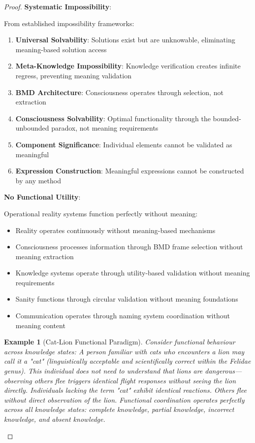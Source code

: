 \documentclass[12pt,a4paper]{article}
\newtheorem{example}{Example}
\begin{document}
\begin{proof}
\textbf{Systematic Impossibility}:

From established impossibility frameworks:
\begin{enumerate}
\item \textbf{Universal Solvability}: Solutions exist but are unknowable, eliminating meaning-based solution access
\item \textbf{Meta-Knowledge Impossibility}: Knowledge verification creates infinite regress, preventing meaning validation
\item \textbf{BMD Architecture}: Consciousness operates through selection, not extraction 
\item \textbf{Consciousness Solvability}: Optimal functionality through the bounded-unbounded paradox, not meaning requirements  
\item \textbf{Component Significance}: Individual elements cannot be validated as meaningful
\item \textbf{Expression Construction}: Meaningful expressions cannot be constructed by any method
\end{enumerate}

\textbf{No Functional Utility}:

Operational reality systems function perfectly without meaning:
\begin{itemize}
\item Reality operates continuously without meaning-based mechanisms
\item Consciousness processes information through BMD frame selection without meaning extraction
\item Knowledge systems operate through utility-based validation without meaning requirements
\item Sanity functions through circular validation without meaning foundations
\item Communication operates through naming system coordination without meaning content
\end{itemize}

\begin{example}[Cat-Lion Functional Paradigm]
Consider functional behaviour across knowledge states: A person familiar with cats who encounters a lion may call it a "cat" (linguistically acceptable and scientifically correct within the Felidae genus). This individual does not need to understand that lions are dangerous—observing others flee triggers identical flight responses without seeing the lion directly. Individuals lacking the term "cat" exhibit identical reactions. Others flee without direct observation of the lion. Functional coordination operates perfectly across all knowledge states: complete knowledge, partial knowledge, incorrect knowledge, and absent knowledge.
\end{example}


\end{proof}
\end{document}
